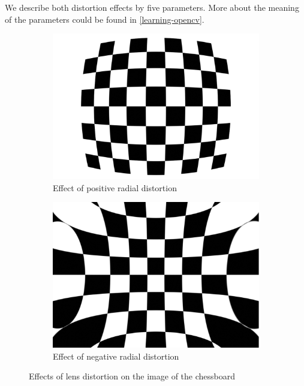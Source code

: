 We describe both distortion effects by five parameters. More about the meaning
of the parameters could be found in \ref{learning-opencv}.

\begin{figure}
	\begin{subfigure}[b]{0.48\linewidth}
		\includegraphics[width=\linewidth]{img/chessboard/7x8chessboard-positivedistortion}
		\caption{Effect of positive radial distortion}
	\end{subfigure}
	\begin{subfigure}[b]{0.48\linewidth}
		\includegraphics[width=\linewidth]{img/chessboard/7x8chessboard-negativedistortion}
		\caption{Effect of negative radial distortion}
	\end{subfigure}
	\caption{Effects of lens distortion on the image of the chessboard}
	\label{fig:distortion}
\end{figure}

